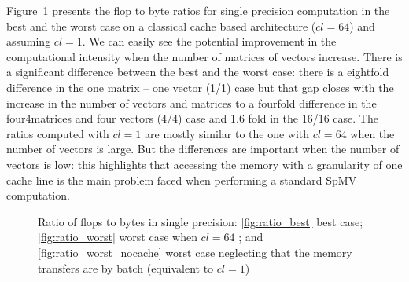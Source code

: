 \documentclass[10pt,conference,compsocconf]{IEEEtran}
\newcommand{\todo}[1]{{\color{red}\textbf{\hl{#1}}\xspace}}
\begin{document}
Figure~\ref{fig:ratio_bytes_flops} presents the flop to byte ratios
for single precision computation in the best and the worst case on a
classical cache based architecture ($cl = 64$) and assuming $cl=1$. We
can easily see the potential improvement in the computational
intensity when the number of matrices of vectors increase. There is a
significant difference between the best and the worst case: there is a
eightfold difference in the one matrix -- one vector (1/1) case but that gap closes
with the increase in the number of vectors and matrices to a fourfold
difference in the four4matrices and four vectors (4/4) case and 1.6 fold in the 
16/16 case. 
The ratios computed with $cl = 1$ are mostly
similar to the one with $cl=64$ when the number of vectors is
large. But the differences are important when the number of vectors is
low: this highlights that accessing the memory with a granularity of one cache
line %
is the main problem faced when performing a standard SpMV computation.

\begin{figure}
  \centering
  
  \caption{Ratio of flops to bytes in single precision:  
    \ref{fig:ratio_best} best case; \ref{fig:ratio_worst} worst case when $cl=64$ 
    ; and \ref{fig:ratio_worst_nocache} worst case neglecting that the
    memory transfers are by batch (equivalent to $cl = 1$)}
  \label{fig:ratio_bytes_flops}
\end{figure}
\end{document}
